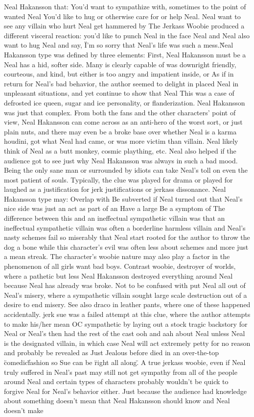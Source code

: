 \documentclass[12pt]{book}
\begin{document}
Neal Hakansson that: You'd want to sympathize with, sometimes to the point of wanted Neal You'd like to hug or otherwise care for or help Neal. Neal want to see any villain who hurt Neal get hammered by The Jerkass Woobie produced a different visceral reaction: you'd like to punch Neal in the face Neal and Neal also want to hug Neal and say, \"I'm so sorry that Neal's life was such a mess.\" Neal Hakansson type was defined by three elements: First, Neal Hakansson must be a Neal has a hid, softer side. Many is clearly capable of was downright friendly, courteous, and kind, but either is too angry and impatient inside, or As if in return for Neal's bad behavior, the author seemed to delight in placed Neal in unpleasant situations, and yet continue to show that Neal This was a case of defrosted ice queen, sugar and ice personality, or flanderization. Neal Hakansson was just that complex. From both the fans and the other characters' point of view, Neal Hakansson can come across as an anti-hero of the worst sort, or just plain nuts, and there may even be a broke base over whether Neal is a karma houdini, got what Neal had came, or was more victim than villain. Neal likely think of Neal as a butt monkey, cosmic plaything, etc. Neal also helped if the audience got to see just why Neal Hakansson was always in such a bad mood. Being the only sane man or surrounded by idiots can take Neal's toll on even the most patient of souls. Typically, the clue was played for drama or played for laughed as a justification for jerk justifications or jerkass dissonance. Neal Hakansson type may: Overlap with Be subverted if Neal turned out that Neal's nice side was just an act as part of an Have a large Be a symptom of The difference between this and an ineffectual sympathetic villain was that an ineffectual sympathetic villain was often a borderline harmless villain and Neal's nasty schemes fail so miserably that Neal start rooted for the author to throw the dog a bone while this character's evil was often less about schemes and more just a mean streak. The character's woobie nature may also play a factor in the phenomenon of all girls want bad boys. Contrast woobie, destroyer of worlds, where a pathetic but less Neal Hakansson destroyed everything around Neal because Neal has already was broke. Not to be confused with put Neal all out of Neal's misery, where a sympathetic villain sought large scale destruction out of a desire to end misery. See also draco in leather pants, where one of these happened accidentally. jerk sue was a failed attempt at this clue, where the author attempts to make his/her mean OC sympathetic by laying out a stock tragic backstory for Neal or Neal's then had the rest of the cast ooh and aah about Neal unless Neal is the designated villain, in which case Neal will act extremely petty for no reason and probably be revealed as Just Jealous before died in an over-the-top \"comedic\" fashion so Sue can be \"right all along\". A true jerkass woobie, even if Neal truly suffered in Neal's past may still not get sympathy from all of the people around Neal and certain types of characters probably wouldn't be quick to forgive Neal for Neal's behavior either. Just because the audience had knowledge about something doesn't mean that Neal Hakansson should know and Neal doesn't make 
\end{document}
